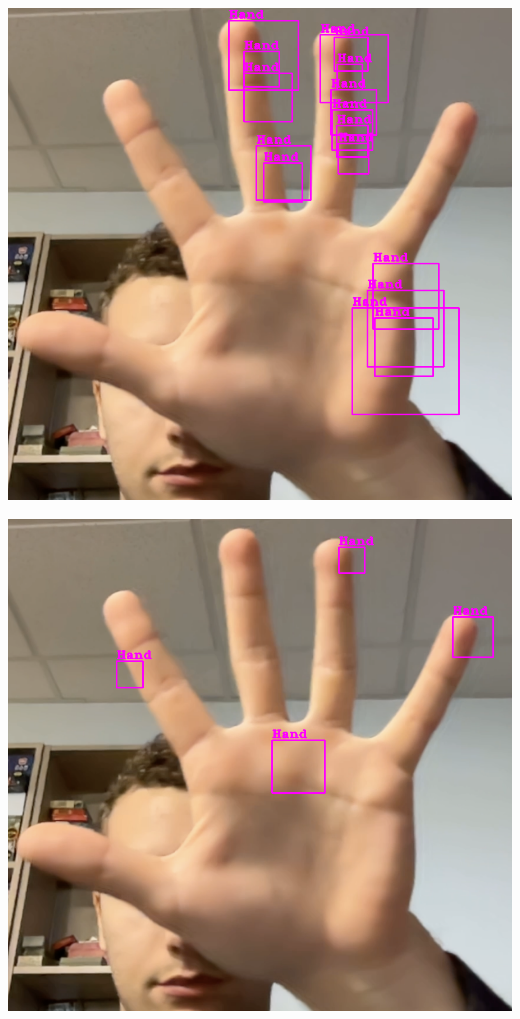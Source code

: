 \documentclass[11pt]{article}
\begin{document}
\begin{minipage}{0.45\textwidth}
    \centering
    \includegraphics[width=\textwidth]{images/cascade0.png}
\end{minipage}
\begin{minipage}{0.45\textwidth}
    \centering
    \includegraphics[width=\textwidth]{images/cascade1.png}
\end{minipage}
\end{document}
